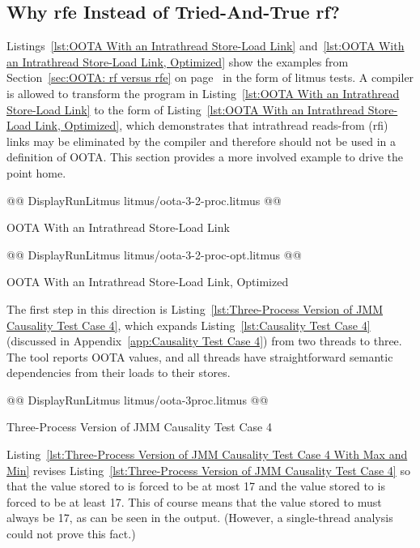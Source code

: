 \documentclass[10]{article}
\begin{document}
\subsection{Why rfe Instead of Tried-And-True rf?}
\label{app:Why rfe Instead of Tried-And-True rf?}

Listings~\ref{lst:OOTA With an Intrathread Store-Load Link}
and~\ref{lst:OOTA With an Intrathread Store-Load Link, Optimized}
show the examples from
Section~\ref{sec:OOTA: rf versus rfe}
on
page~\pageref{sec:OOTA: rf versus rfe}
in the form of litmus tests.
A compiler is allowed to transform the program in
Listing~\ref{lst:OOTA With an Intrathread Store-Load Link}
to the form of
Listing~\ref{lst:OOTA With an Intrathread Store-Load Link, Optimized},
which demonstrates that intrathread reads-from (rfi) links may be
eliminated by the compiler and therefore should not be used in a
definition of OOTA.
This section provides a more involved example to drive the point home.

\begin{listing}[tbp]
@@ DisplayRunLitmus litmus/oota-3-2-proc.litmus @@
\caption{OOTA With an Intrathread Store-Load Link}
\label{lst:OOTA With an Intrathread Store-Load Link}
\end{listing}

\begin{listing}[tbp]
@@ DisplayRunLitmus litmus/oota-3-2-proc-opt.litmus @@
\caption{OOTA With an Intrathread Store-Load Link, Optimized}
\label{lst:OOTA With an Intrathread Store-Load Link, Optimized}
\end{listing}

The first step in this direction is
Listing~\ref{lst:Three-Process Version of JMM Causality Test Case 4},
which expands
Listing~\ref{lst:Causality Test Case 4}
(discussed in
Appendix~\ref{app:Causality Test Case 4})
from two threads to three.
The  tool reports OOTA values, and
all threads have straightforward semantic dependencies from their
loads to their stores.

\begin{listing}[tbp]
@@ DisplayRunLitmus litmus/oota-3proc.litmus @@
\caption{Three-Process Version of JMM Causality Test Case 4}
\label{lst:Three-Process Version of JMM Causality Test Case 4}
\end{listing}

Listing~\ref{lst:Three-Process Version of JMM Causality Test Case 4 With Max and Min}
revises Listing~\ref{lst:Three-Process Version of JMM Causality Test Case 4}
so that the value stored to  is forced to be at most 17
and the value stored to  is forced to be at least 17.
This of course means that the value stored to  must always be
17, as can be seen in the  output.
(However, a single-thread analysis could not prove this fact.)
\end{document}
